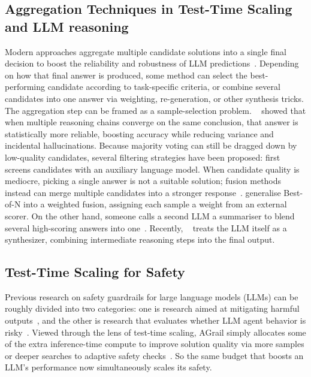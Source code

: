 \documentclass[11pt]{article}
\theoremstyle{definition}
\theoremstyle{remark}
\begin{document}
\subsection{Aggregation Techniques in Test-Time Scaling and LLM reasoning}
Modern approaches aggregate multiple candidate solutions into a single final decision to boost the reliability and robustness of LLM predictions~\citep{zhang2025survey}. Depending on how that final answer is produced, some method can select the best-performing candidate according to task-specific criteria, or combine several candidates into one answer via weighting, re-generation, or other synthesis tricks. The aggregation step can be framed as a sample-selection problem. ~\cite{wangself} showed that when multiple reasoning chains converge on the same conclusion, that answer is statistically more reliable, boosting accuracy while reducing variance and incidental hallucinations. Because majority voting can still be dragged down by low-quality candidates, several filtering strategies have been proposed: \cite{chen2024are} first screens candidates with an auxiliary language model. When candidate quality is mediocre, picking a single answer is not a suitable solution; fusion methods instead can merge multiple candidates into a stronger response~\citep{irvine2023rewarding}. \cite{brown2024largelanguagemonkeysscaling, li-etal-2023-making} generalise Best-of-N into a weighted fusion, assigning each sample a weight from an external scorer. On the other hand, someone calls a second LLM a summariser to blend several high-scoring answers into one~\citep{jiang-etal-2023-llm}. Recently, ~\cite{li2025llms} treats the LLM itself as a synthesizer, combining intermediate reasoning steps into the final output.







\subsection{Test-Time Scaling for Safety}

Previous research on safety guardrails for large language models (LLMs) can be roughly divided into two categories: one is research aimed at mitigating harmful outputs~\citep{rebedea-etal-2023-nemo, yuan2024rigorllm}, and the other is research that evaluates whether LLM agent behavior is risky~\citep{naihintesting, liaoeia}. Viewed through the lens of test-time scaling, AGrail simply allocates some of the extra inference-time compute to improve solution quality via more samples or deeper searches to adaptive safety checks~\citep{luo-etal-2025-agrail}. So the same budget that boosts an LLM’s performance now simultaneously scales its safety.
\end{document}
